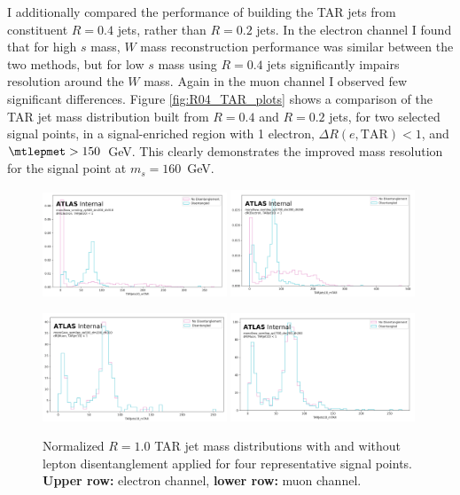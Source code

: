 I additionally compared the performance of building the TAR jets from constituent \akt $R=0.4$ jets, rather than \akt $R=0.2$ jets.
In the electron channel I found that for high $s$ mass, $W$ mass reconstruction performance was similar between the two methods, but for low $s$ mass using \akt $R=0.4$ jets significantly impairs resolution around the $W$ mass.
Again in the muon channel I observed few significant differences.
Figure \ref{fig:R04_TAR_plots} shows a comparison of the TAR jet mass distribution built from \akt $R=0.4$ and \akt $R=0.2$ jets, for two selected signal points, in a signal-enriched region with 1 electron, $\Delta R(e, \text{TAR})< 1$, and $\mtlepmet > 150$~GeV. This clearly demonstrates the improved mass resolution for the signal point at $m_s = 160 $~GeV.
\begin{figure}[!h]
\centering
   \includegraphics[width = 0.49\textwidth]{Figures/4/TAR/monoSww_semilep_zp500_dm200_dh310.png}
   \includegraphics[width = 0.49\textwidth]{Figures/4/TAR/monoSww_semilep_zp1700_dm200_dh260.png}

   \includegraphics[width = 0.49\textwidth]{Figures/4/TAR/mu_monoSww_semilep_zp500_dm200_dh310.png}
   \includegraphics[width = 0.49\textwidth]{Figures/4/TAR/mu_monoSww_semilep_zp1700_dm200_dh260.png}

   \caption{Normalized $R=1.0$ TAR jet mass distributions with and without lepton disentanglement applied for four representative signal points. \textbf{Upper row:} electron channel, \textbf{lower row:} muon channel.}
   \label{fig:TARdisentaglementplots}
\end{figure}

